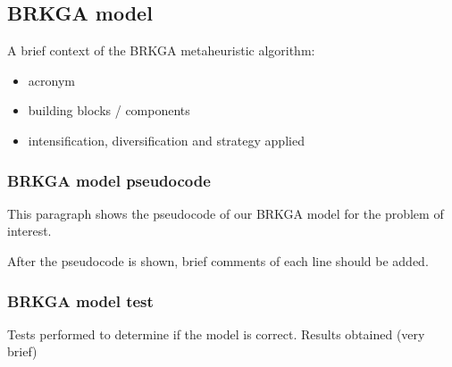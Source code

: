 \subsection{BRKGA model}

A brief context of the BRKGA metaheuristic algorithm:
\begin{itemize}
	\item acronym
	\item building blocks / components
	\item intensification, diversification and strategy applied
\end{itemize}

\subsubsection{BRKGA model pseudocode}

This paragraph shows the pseudocode of our BRKGA model for the problem of interest.

After the pseudocode is shown, brief comments of each line should be added.



\subsubsection{BRKGA model test}

Tests performed to determine if the model is correct. Results obtained (very brief)



\pagebreak